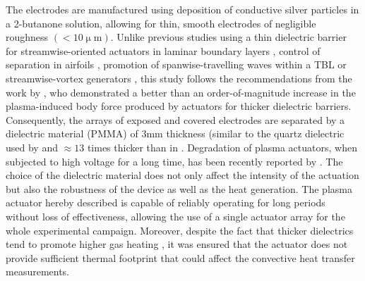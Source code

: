 
The electrodes are manufactured using deposition of conductive silver particles in a 2-butanone solution, allowing for thin, smooth electrodes of negligible roughness $(< 10 \upmu \mathrm{m})$. Unlike previous studies using a thin dielectric barrier for streamwise-oriented actuators in laminar boundary layers \citep{Jukes2012,jukes2013plasmaVG}, control of separation in airfoils \citep{jukes2013nacaVG}, promotion of spanwise-travelling waves within a TBL \citep{Whalley2014} or streamwise-vortex generators \citep{cheng_wong_hussain_schroder_zhou_2021}, this study follows the recommendations from the work by \citet{thomas2009dbdopt}, who demonstrated a better than an order-of-magnitude increase in the plasma-induced body force produced by actuators for thicker dielectric barriers. Consequently, the arrays of exposed and covered electrodes are separated by a dielectric material (PMMA) of $3 \mathrm{mm}$ thickness (similar to the quartz dielectric used by \citet{Wicks2015} and $\approx 13$ times thicker than in \citet{Jukes2012,jukes2013plasmaVG, Whalley2014,cheng_wong_hussain_schroder_zhou_2021}. Degradation of plasma actuators, when subjected to high voltage for a long time, has been recently reported by \citet{cheng_wong_hussain_schroder_zhou_2021}. The choice of the dielectric material does not only affect the intensity of the actuation but also the robustness of the device as well as the heat generation. The plasma actuator hereby described is capable of reliably operating for long periods without loss of effectiveness, allowing the use of a single actuator array for the whole experimental campaign. Moreover, despite the fact that thicker dielectrics tend to promote higher gas heating \citep{Rodrigues2018b}, it was ensured that the actuator does not provide sufficient thermal footprint that could affect the convective heat transfer measurements.

